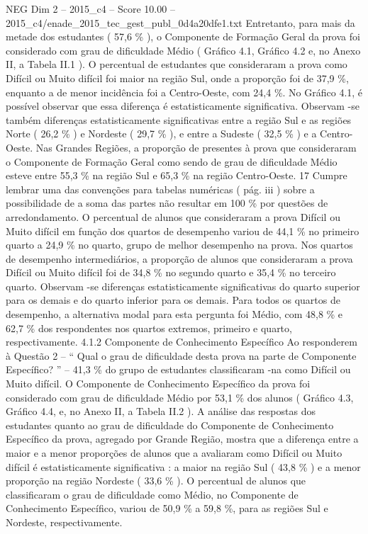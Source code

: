 \begin{textsample}{NEG Dim 2 – 2015\_c4 – Score 10.00 – 2015\_c4/enade\_2015\_tec\_gest\_publ\_0d4a20dfe1.txt}
Entretanto, para mais da metade dos estudantes ( 57,6 \% ), o Componente de Formação Geral da prova foi considerado com grau de dificuldade Médio ( Gráfico 4.1, Gráfico 4.2 e, no Anexo II, a Tabela II.1 ).
O percentual de estudantes que consideraram a prova como Difícil ou Muito difícil foi maior na região Sul, onde a proporção foi de 37,9 \%, enquanto a de menor incidência foi a Centro-Oeste, com 24,4 \%.
No Gráfico 4.1, é possível observar que essa diferença é estatisticamente significativa.
Observam -se também diferenças estatisticamente significativas entre a região Sul e as regiões Norte ( 26,2 \% ) e Nordeste ( 29,7 \% ), e entre a Sudeste ( 32,5 \% ) e a Centro-Oeste.
Nas Grandes Regiões, a proporção de presentes à prova que consideraram o Componente de Formação Geral como sendo de grau de dificuldade Médio esteve entre 55,3 \% na região Sul e 65,3 \% na região Centro-Oeste. 17 Cumpre lembrar uma das convenções para tabelas numéricas ( pág. iii ) sobre a possibilidade de a soma das partes não resultar em 100 \% por questões de arredondamento.
O percentual de alunos que consideraram a prova Difícil ou Muito difícil em função dos quartos de desempenho variou de 44,1 \% no primeiro quarto a 24,9 \% no quarto, grupo de melhor desempenho na prova.
Nos quartos de desempenho intermediários, a proporção de alunos que consideraram a prova Difícil ou Muito difícil foi de 34,8 \% no segundo quarto e 35,4 \% no terceiro quarto.
Observam -se diferenças estatisticamente significativas do quarto superior para os demais e do quarto inferior para os demais.
Para todos os quartos de desempenho, a alternativa modal para esta pergunta foi Médio, com 48,8 \% e 62,7 \% dos respondentes nos quartos extremos, primeiro e quarto, respectivamente. 4.1.2 Componente de Conhecimento Específico Ao responderem à Questão 2 – “ Qual o grau de dificuldade desta prova na parte de Componente Específico? ” – 41,3 \% do grupo de estudantes classificaram -na como Difícil ou Muito difícil.
O Componente de Conhecimento Específico da prova foi considerado com grau de dificuldade Médio por 53,1 \% dos alunos ( Gráfico 4.3, Gráfico 4.4, e, no Anexo II, a Tabela II.2 ).
A análise das respostas dos estudantes quanto ao grau de dificuldade do Componente de Conhecimento Específico da prova, agregado por Grande Região, mostra que a diferença entre a maior e a menor proporções de alunos que a avaliaram como Difícil ou Muito difícil é estatisticamente significativa : a maior na região Sul ( 43,8 \% ) e a menor proporção na região Nordeste ( 33,6 \% ).
O percentual de alunos que classificaram o grau de dificuldade como Médio, no Componente de Conhecimento Específico, variou de 50,9 \% a 59,8 \%, para as regiões Sul e Nordeste, respectivamente.

\end{textsample}
